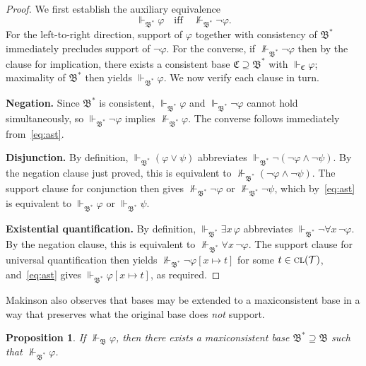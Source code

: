 \documentclass[reqno]{asl}
\newtheorem{proposition}[definition]{Proposition}
\newcommand{\setTerm}{\mathcal{T}}
\newcommand{\closure}{\textsc{cl}}
\newcommand{\setClosedTerm}{\closure(\setTerm)}
\newcommand{\supp}{\Vdash}
\newcommand{\base}[1]{\mathfrak{#1}}
\newcommand{\mbase}[1]{{\mathfrak{#1}^\ast}}
\begin{document}
\begin{proof}
We first establish the auxiliary equivalence
\begin{equation}\label{eq:ast}
    \supp_{\mbase{B}} \varphi
    \quad\mbox{iff}\quad
    \not\supp_{\mbase{B}} \neg\varphi.
    \tag{$*$}
\end{equation}
For the left-to-right direction, support of $\varphi$ together with
consistency of $\mbase{B}$ immediately precludes support of
$\neg\varphi$.  For the converse, if $\not\supp_{\mbase{B}} \neg\varphi$
then by the clause for implication, there exists a consistent base
$\base{C} \supseteq \mbase{B}$ with $\supp_{\base{C}} \varphi$;
maximality of $\mbase{B}$ then yields $\supp_{\mbase{B}} \varphi$.
We now verify each clause in turn.

\medskip\textbf{Negation.}\;
Since $\mbase{B}$ is consistent, $\supp_{\mbase{B}} \varphi$ and
$\supp_{\mbase{B}} \neg\varphi$ cannot hold simultaneously, so
$\supp_{\mbase{B}} \neg\varphi$ implies $\not\supp_{\mbase{B}} \varphi$.
The converse follows immediately from~\eqref{eq:ast}.

\medskip\textbf{Disjunction.}\;
By definition, $\supp_{\mbase{B}}(\varphi \lor \psi)$ abbreviates
$\supp_{\mbase{B}} \neg(\neg\varphi \land \neg\psi)$.  By the negation
clause just proved, this is equivalent to
$\not\supp_{\mbase{B}}(\neg\varphi \land \neg\psi)$.  The support clause
for conjunction then gives $\not\supp_{\mbase{B}} \neg\varphi$ or
$\not\supp_{\mbase{B}} \neg\psi$, which by~\eqref{eq:ast} is equivalent
to $\supp_{\mbase{B}} \varphi$ or $\supp_{\mbase{B}} \psi$.

\medskip\textbf{Existential quantification.}\;
By definition, $\supp_{\mbase{B}} \exists x\,\varphi$ abbreviates
$\supp_{\mbase{B}} \neg\forall x\,\neg\varphi$.  By the negation clause,
this is equivalent to $\not\supp_{\mbase{B}} \forall x\,\neg\varphi$.
The support clause for universal quantification then yields
$\not\supp_{\mbase{B}} \neg\varphi[x \mapsto t]$ for some
$t \in \setClosedTerm$, and~\eqref{eq:ast} gives
$\supp_{\mbase{B}} \varphi[x \mapsto t]$, as required.
\end{proof}

Makinson also observes that bases may be extended to a maxiconsistent base in a way 
that preserves what the original base does \emph{not} support.

\begin{proposition}\label{prop:maxiconsistent-extension}
If $\not\supp_{\base{B}} \varphi$, then 
there exists a maxiconsistent base $\mbase{B} \supseteq \base{B}$ 
such that $\not\supp_{\mbase{B}} \varphi$.
\end{proposition}
\end{document}
